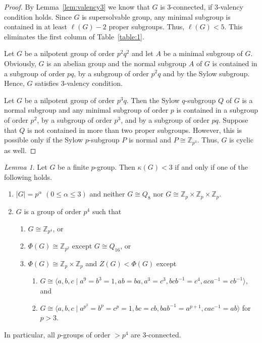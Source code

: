 \documentclass[a4paper,12pt]{article}
\theoremstyle{definition}
\theoremstyle{remark}
\theoremstyle{theorem}
\newtheorem{lem}[theorem]{Lemma}
\begin{document}
\begin{proof}
  By Lemma~\ref{lem:valency3} we know that $G$ is $3$-connected, if
  $3$-valency condition holds. Since $G$ is supersolvable group, any
  minimal subgroup is contained in at least $\ell(G)-2$ proper
  subgroups. Thus, $\ell(G)< 5$. This eliminates the first column of
  Table~\ref{table:1}.
  
  Let $G$ be a nilpotent group of order $p^2q^2$ and let $A$ be a
  minimal subgroup of $G$. Obviously, $G$ is an abelian group and the
  normal subgroup $A$ of $G$ is contained in a subgroup of order $pq$,
  by a subgroup of order $p^2q$ and by the Sylow subgroup. Hence, $G$
  satisfies $3$-valency condition.
  
  Let $G$ be a nilpotent group of order $p^3q$. Then the Sylow
  $q$-subgroup $Q$ of $G$ is a normal subgroup and any minimal
  subgroup of order $p$ is contained in a subgroup of order $p^2$, by
  a subgroup of order $p^3$, and by a subgroup of order $pq$. Suppose
  that $Q$ is not contained in more than two proper
  subgroups. However, this is possible only if the Sylow $p$-subgroup
  $P$ is normal and $P\cong\mathbb{Z}_{p^3}$. Thus, $G$ is cyclic as
  well.
\end{proof}

\begin{lem}\label{lem:pgroup3}
  Let $G$ be a finite $p$-group. Then $\kappa(G)<3$ if and only if one
  of the following holds.
  \begin{enumerate}
  \item $|G|=p^{\alpha}$ $(0\leq\alpha\leq 3)$ and neither
    $G\cong Q_8$ nor
    $G\cong \mathbb{Z}_p\times\mathbb{Z}_p\times\mathbb{Z}_p$.
  \item $G$ is a group of order $p^4$ such that
    \begin{enumerate}
    \item $G\cong \mathbb{Z}_{p^4}$, or
    \item $\Phi(G)\cong\mathbb{Z}_{p^2}$ except $G\cong Q_{16}$, or
    \item
      $\Phi(G)\cong\mathbb{Z}_p\times\mathbb{Z}_p$ and $Z(G)<\Phi(G)$
      except
      \begin{enumerate}
      \item $G\cong \langle a,b,c\mid a^9=b^3=1, ab=ba, a^3=c^3,
      bcb^{-1}=c^4, aca^{-1}=cb^{-1} \rangle $, and 
      \item $G\cong \langle a,b,c\mid a^{p^2}=b^p=c^p=1, bc=cb, bab^{-1}=a^{p+1}, cac^{-1}=ab \rangle$ for $p>3$. 
      \end{enumerate}      
    \end{enumerate}
  \end{enumerate}
  In particular, all $p$-groups of order $>p^4$ are $3$-connected.
\end{lem}
\end{document}
